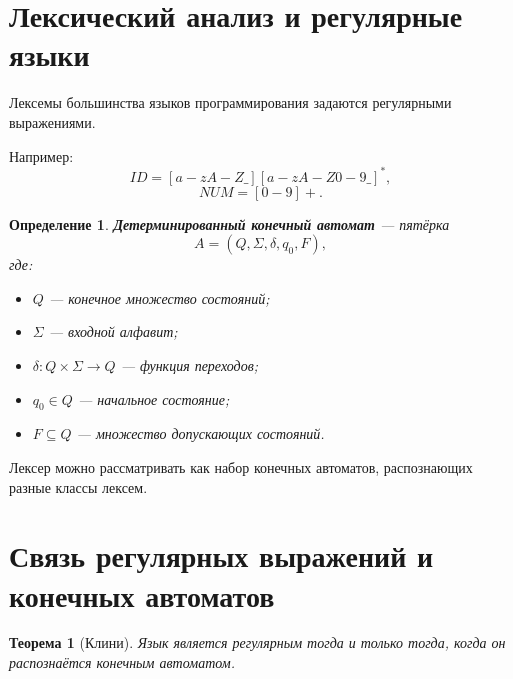 \documentclass[12pt,a4paper]{article}
\newtheorem{theorem}{Теорема}
\newtheorem{definition}{Определение}
\begin{document}
\section{Лексический анализ и регулярные языки}

Лексемы большинства языков программирования задаются регулярными выражениями.

Например:
\[
ID = [a-zA-Z\_][a-zA-Z0-9\_]^{*},
\]
\[
NUM = [0-9]+.
\]

\begin{definition}
\textbf{Детерминированный конечный автомат} --- пятёрка
\[
A=(Q,\Sigma,\delta,q_0,F),
\]
где:
\begin{itemize}
    \item $Q$ --- конечное множество состояний;
    \item $\Sigma$ --- входной алфавит;
    \item $\delta:Q\times\Sigma\to Q$ --- функция переходов;
    \item $q_0\in Q$ --- начальное состояние;
    \item $F\subseteq Q$ --- множество допускающих состояний.
\end{itemize}
\end{definition}

Лексер можно рассматривать как набор конечных автоматов, распознающих разные классы лексем.

\section{Связь регулярных выражений и конечных автоматов}

\begin{theorem}[Клини]
Язык является регулярным тогда и только тогда, когда он распознаётся конечным автоматом.
\end{theorem}
\end{document}
